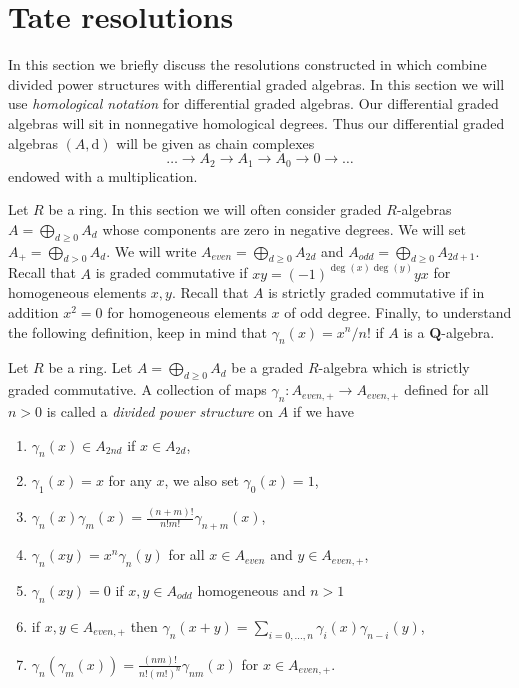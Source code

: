\section{Tate resolutions}
\label{section-tate}

\noindent
In this section we briefly discuss the resolutions constructed in
\cite{Tate-homology} which combine divided power structures with
differential graded algebras.
In this section we will use {\it homological notation} for
differential graded algebras.
Our differential graded algebras will sit in nonnegative homological
degrees. Thus our differential graded algebras $(A, \text{d})$
will be given as chain complexes
$$
\ldots \to A_2 \to A_1 \to A_0 \to 0 \to \ldots
$$
endowed with a multiplication.

\medskip\noindent
Let $R$ be a ring. In this section we will often consider graded
$R$-algebras $A = \bigoplus_{d \geq 0} A_d$ whose components are
zero in negative degrees. We will set $A_+ = \bigoplus_{d > 0} A_d$.
We will write $A_{even} = \bigoplus_{d \geq 0} A_{2d}$ and
$A_{odd} = \bigoplus_{d \geq 0} A_{2d + 1}$.
Recall that $A$ is graded commutative if
$x y = (-1)^{\deg(x)\deg(y)} y x$ for homogeneous elements $x, y$.
Recall that $A$ is strictly graded commutative if in addition
$x^2 = 0$ for homogeneous elements $x$ of odd degree. Finally, to understand
the following definition, keep in mind that $\gamma_n(x) = x^n/n!$
if $A$ is a $\mathbf{Q}$-algebra.

\begin{definition}
\label{definition-divided-powers-graded}
Let $R$ be a ring. Let $A = \bigoplus_{d \geq 0} A_d$ be a graded
$R$-algebra which is strictly graded commutative. A collection of maps
$\gamma_n : A_{even, +} \to A_{even, +}$ defined for all $n > 0$ is called
a {\it divided power structure} on $A$ if we have
\begin{enumerate}
\item $\gamma_n(x) \in A_{2nd}$ if $x \in A_{2d}$,
\item $\gamma_1(x) = x$ for any $x$, we also set $\gamma_0(x) = 1$,
\item $\gamma_n(x)\gamma_m(x) = \frac{(n + m)!}{n! m!} \gamma_{n + m}(x)$,
\item $\gamma_n(xy) = x^n \gamma_n(y)$ for all $x \in A_{even}$ and
$y \in A_{even, +}$,
\item $\gamma_n(xy) = 0$ if $x, y \in A_{odd}$ homogeneous and $n > 1$
\item if $x, y \in A_{even, +}$ then
$\gamma_n(x + y) = \sum_{i = 0, \ldots, n} \gamma_i(x)\gamma_{n - i}(y)$,
\item $\gamma_n(\gamma_m(x)) =
\frac{(nm)!}{n! (m!)^n} \gamma_{nm}(x)$ for $x \in A_{even, +}$.
\end{enumerate}
\end{definition}

